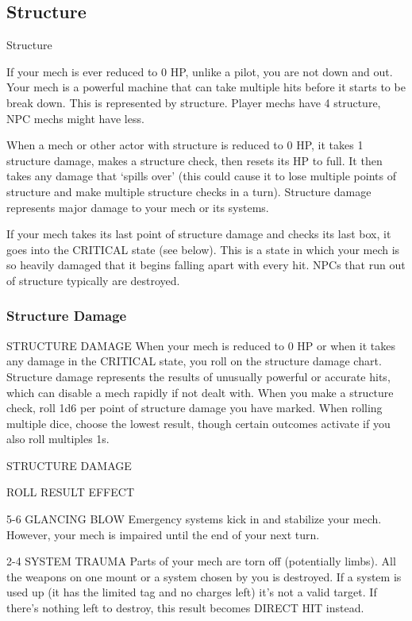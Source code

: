 \subsection{Structure}
                                                Structure

If your mech is ever reduced to 0 HP, unlike a pilot, you are not down and out. Your mech is a
powerful machine that can take multiple hits before it starts to be break down. This is
represented by structure. Player mechs have 4 structure, NPC mechs might have less.





When a mech or other actor with structure is reduced to 0 HP, it takes 1 structure damage,
makes a structure check, then resets its HP to full. It then takes any damage that ‘spills
over’ (this could cause it to lose multiple points of structure and make multiple structure checks
in a turn). Structure damage represents major damage to your mech or its systems.


If your mech takes its last point of structure damage and checks its last box, it goes into the
CRITICAL state (see below). This is a state in which your mech is so heavily damaged that it
begins falling apart with every hit. NPCs that run out of structure typically are destroyed.

\subsubsection{Structure Damage}
                                        STRUCTURE DAMAGE
When your mech is reduced to 0 HP or when it takes any damage in the CRITICAL state, you roll
on the structure damage chart. Structure damage represents the results of unusually powerful or
accurate hits, which can disable a mech rapidly if not dealt with. When you make a structure
check, roll 1d6 per point of structure damage you have marked. When rolling multiple dice,
choose the lowest result, though certain outcomes activate if you also roll multiples 1s.


                                            STRUCTURE DAMAGE

 ROLL            RESULT                   EFFECT

 5-6             GLANCING BLOW            Emergency systems kick in and stabilize your mech. However, your
                                          mech is impaired until the end of your next turn.

 2-4             SYSTEM TRAUMA            Parts of your mech are torn off (potentially limbs). All the weapons
                                          on one mount or a system chosen by you is destroyed. If a system
                                          is used up (it has the limited tag and no charges left) it’s not a valid
                                          target. If there’s nothing left to destroy, this result becomes DIRECT
                                          HIT instead.

